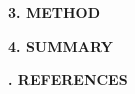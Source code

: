 \begin{multicols}{2}

\textbf{\LARGE{3. METHOD}} \\
\normalsize{}


\textbf{\LARGE{4. SUMMARY}} \\
\normalsize{}


\begin{flushleft} %
\textbf{\LARGE{. REFERENCES}} \\
\normalsize{}
\end{flushleft}
\end{multicols}
